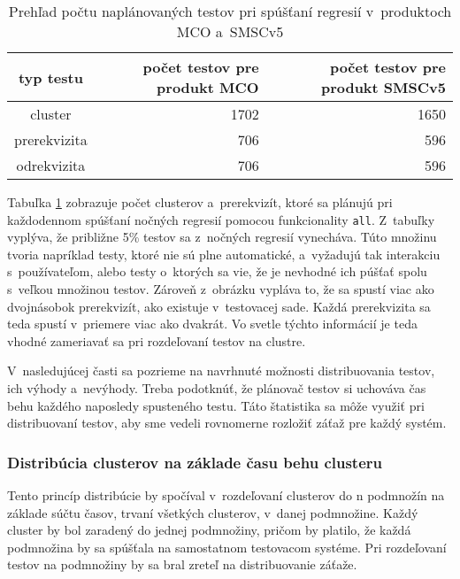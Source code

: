 \begin{table}
  \begin{center}
    \begin{tabular}{| c | r | r |}
    \hline
    typ testu  & počet testov pre produkt MCO & počet testov pre produkt SMSCv5 \\ \hline
    cluster      & 1702 & 1650 \\ \hline
    prerekvizita & 706  & 596  \\ \hline
    odrekvizita  & 706  & 596 \\
    \hline
    \end{tabular}
    \label{table:pocet_naplanovanych_testov}
    \caption{Prehľad počtu naplánovaných testov pri spúšťaní regresií v~produktoch MCO a~SMSCv5}
  \end{center}
\end{table}

Tabuľka \ref{table:pocet_naplanovanych_testov} zobrazuje počet clusterov a~prerekvizít, ktoré sa plánujú
pri každodennom spúšťaní nočných regresií pomocou funkcionality \texttt{all}. Z~tabuľky vyplýva, že približne 5\% testov sa 
z~nočných regresií vynecháva. Túto množinu tvoria napríklad testy, ktoré nie sú plne automatické, a~vyžadujú tak interakciu s~používateľom,
alebo testy o~ktorých sa vie, že je nevhodné ich púšťať spolu s~veľkou množinou testov.
Zároveň z~obrázku vypláva to, že sa spustí viac ako dvojnásobok prerekvizít, ako existuje v~testovacej sade.
Každá prerekvizita sa teda spustí v~priemere viac ako dvakrát. 
Vo svetle týchto informácií je teda vhodné zameriavať sa pri rozdeľovaní testov na clustre.

V~nasledujúcej časti sa pozrieme na navrhnuté možnosti distribuovania testov, ich výhody a~nevýhody.
Treba podotknúť, že plánovač testov si uchováva čas behu každého naposledy spusteného testu.
Táto štatistika sa môže využiť pri distribuovaní testov, aby sme vedeli rovnomerne rozložiť záťaž pre každý systém.
\subsubsection*{Distribúcia clusterov na základe času behu clusteru}
Tento princíp distribúcie by spočíval v~rozdeľovaní clusterov do n podmnožín na základe súčtu časov, 
trvaní všetkých clusterov, v~danej podmnožine. Každý cluster by bol zaradený do jednej podmnožiny, pričom by platilo,
že každá podmnožina by sa spúšťala na samostatnom testovacom systéme. Pri rozdeľovaní testov na podmnožiny by sa bral zreteľ na
distribuovanie záťaže.

